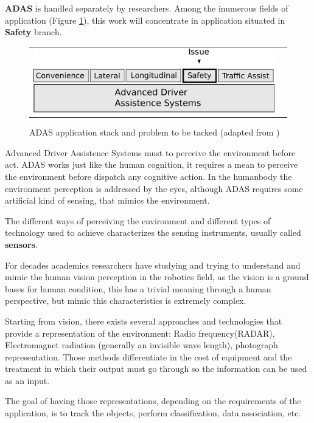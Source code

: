\textbf{ADAS} is handled separately by researchers. Among the inumerous fields of application (Figure \ref{fig:sensor:target}), this work will concentrate in application situated in \textbf{Safety} branch.

\begin{figure}[h]
\centering
	\begin{tabular}{lr}\\
		\includegraphics[scale=0.7]{img/fig:sensor:target} 
	\end{tabular}
	\caption{ADAS application stack and problem to be tacked (adapted from \cite{riener2010sensor})}
	\label{fig:sensor:target}
\end{figure}

Advanced Driver Assistence Systems must to perceive the environment before act. ADAS works just like the human cognition, it requires a mean to perceive the environment before dispatch any cognitive action. In the humanbody the environment perception is addressed by the eyes, although ADAS requires some artificial kind of sensing, that mimics the environment. 

The different ways of perceiving the environment and different types of technology used to achieve characterizes the sensing instruments, usually called \textbf{sensors}.


For decades academics researchers have studying and trying to understand and mimic the human vision perception in the robotics field, as the vision is a ground bases for human condition, this has a trivial meaning through a human perspective, but mimic this characteristics is extremely complex.

Starting from vision, there exists several approaches and technologies that provide a representation of the environment: Radio frequency(RADAR), Electromagnet radiation (generally an invisible wave length), photograph representation. Those methods differentiate in the cost of equipment and the treatment in which their output must go through so the information can be used as an input.

The goal of having those representations, depending on the requirements of the application, is to track the objects, perform classification, data association, etc.

